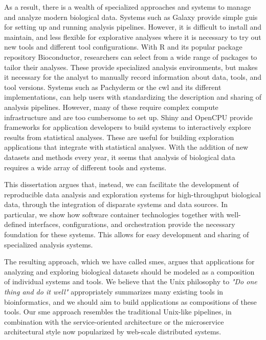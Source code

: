 As a result, there is a wealth of specialized approaches and systems to manage
and analyze modern biological data. Systems such as Galaxy\cite{galaxy} provide
simple \glspl{gui} for setting up and running analysis pipelines. However, it is
difficult to install and maintain, and less flexible for explorative analyses
where it is necessary to try out new tools and different tool
configurations.\cite{spjuth2015experiences} With R and its popular package
repository Bioconductor\cite{bioconductor}, researchers can select from a wide
range of packages to tailor their analyses. These provide specialized analysis
environments, but makes it necessary for the analyst to manually record
information about data, tools, and tool versions. Systems such as
Pachyderm\cite{pachyderm} or the \gls{cwl}\cite{commonwl} and its different
implementations, can help users with standardizing the description and sharing
of analysis pipelines.  However, many of these require complex compute
infrastructure and are too cumbersome to set up.  Shiny\cite{shiny} and
OpenCPU\cite{opencpu} provide frameworks for application developers to build
systems to interactively explore results from statistical analyses.  These are
useful for building exploration applications that integrate with statistical
analyses.  With the addition of new datasets and methods every year, it seems
that analysis of biological data requires a wide array of different tools and
systems.

This dissertation argues that, instead, we can facilitate the development of
reproducible data analysis and exploration systems for high-throughput
biological data, through the integration of disparate systems and data sources.
In particular, we show how software container technologies together with
well-defined interfaces, configurations, and orchestration provide the necessary
foundation for these systems. This allows for easy development and sharing of
specialized analysis systems.


The resulting approach, which we have called \glspl{sme}, argues that
applications for analyzing and exploring biological datasets should be modeled
as a composition of individual systems and tools. We believe that the Unix
philosophy to \emph{"Do one thing and do it well"}\cite{raymond2003art}
appropriately summarizes many existing tools in bioinformatics, and we should
aim to build applications as compositions of these tools. Our \gls{sme} approach
resembles the traditional Unix-like pipelines, in combination with the
service-oriented architecture\cite{erl2005service} or the microservice
architectural style now popularized by web-scale distributed
systems.\cite{nadareishvili2016microservice}

